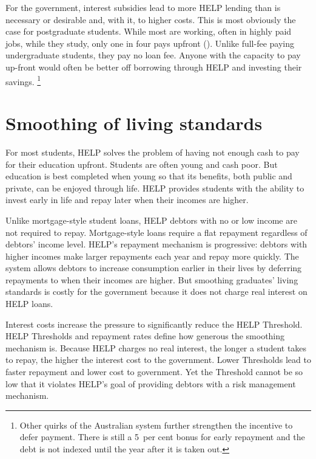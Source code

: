 \documentclass[embargoed]{grattan}
\begin{document}
For the government, interest subsidies lead to more \gls{HELP} lending than is necessary or desirable and, with it, to higher costs.
This is most obviously the case for postgraduate students.
While most are working, often in highly paid jobs, while they study, only one in four pays upfront ().
Unlike full-fee paying undergraduate students, they pay no loan fee.
Anyone with the capacity to pay up-front would often be better off borrowing through \gls{HELP} and investing their savings.%
\footnote{Other quirks of the Australian system further strengthen the incentive to defer payment.
There is still a 5~per cent bonus for early repayment and the debt is not indexed until the year after it is taken out.}

\section{Smoothing of living standards}\label{smoothing-of-living-standards}

For most students, \gls{HELP} solves the problem of having not enough cash to pay for their education upfront.
Students are often young and cash poor.
But education is best completed when young so that its benefits, both public and private, can be enjoyed through life.
\gls{HELP} provides students with the ability to invest early in life and repay later when their incomes are higher.

Unlike mortgage-style student loans, \gls{HELP} debtors with no or low income are not required to repay.
Mortgage-style loans require a flat repayment regardless of debtors' income level.
\gls{HELP}'s repayment mechanism is progressive: debtors with higher incomes make larger repayments each year and repay more quickly.
The system allows debtors to increase consumption earlier in their lives by deferring repayments to when their incomes are higher.
But smoothing graduates' living standards is costly for the government because it does not charge real interest on \gls{HELP} loans.

Interest costs increase the pressure to significantly reduce the \gls{HELP} \gls{Threshold}.
\gls{HELP} \gls{Threshold}s and repayment rates define how generous the smoothing mechanism is.
Because \gls{HELP} charges no real interest, the longer a student takes to repay, the higher the interest cost to the government.
Lower \gls{Threshold}s lead to faster repayment and lower cost to government.
Yet the \gls{Threshold} cannot be so low that it violates \gls{HELP}'s goal of providing debtors with a risk management mechanism.
\end{document}
